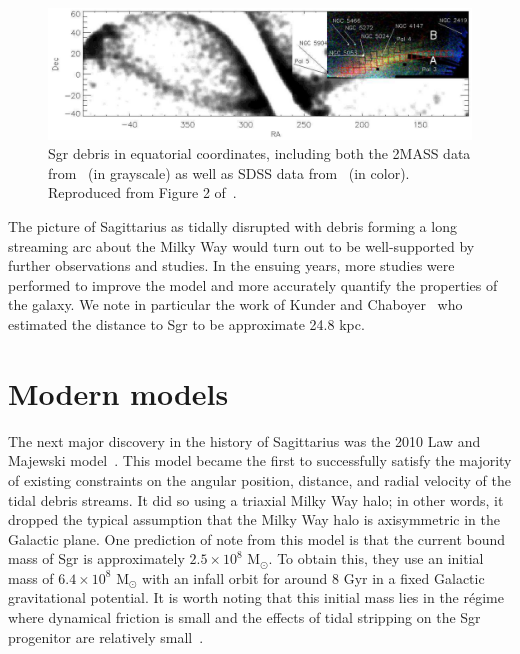 \begin{figure}
    \centering 
    \includegraphics[width=0.95\linewidth]{figs/belokurov2006-2.png}
    \caption{%
        Sgr debris in equatorial coordinates, including both the 2MASS data
        from~\cite{majewski_two_2003} (in grayscale) as well as SDSS data
        from~\cite{belokurov_field_2006} (in color). Reproduced from Figure 2
        of~\cite{belokurov_field_2006}.
    }
    \label{fig:belokurov2006}
\end{figure}

The picture of Sagittarius as tidally disrupted with debris forming a long
streaming arc about the Milky Way would turn out to be well-supported by
further observations and studies. In the ensuing years, more studies were
performed to improve the model and more accurately quantify the properties of
the galaxy. We note in particular the work of Kunder and
Chaboyer~\cite{kunder_distance_2009} who estimated the distance to Sgr to be
approximate 24.8 kpc.


\hypertarget{modern-models}{%
\section{Modern models}\label{modern-models}}

The next major discovery in the history of Sagittarius was the 2010 Law and
Majewski model~\cite{law_sagittarius_2010}. This model became the first to
successfully satisfy the majority of existing constraints on the angular
position, distance, and radial velocity of the tidal debris streams. It did so
using a triaxial Milky Way halo; in other words, it dropped the typical
assumption that the Milky Way halo is axisymmetric in the Galactic plane. One
prediction of note from this model is that the current bound mass of Sgr is
approximately \(2.5 \times 10^8\) M\(_\odot\). To obtain this, they use an
initial mass of \(6.4 \times 10^8\) M\(_\odot\) with an infall orbit for
around 8 Gyr in a fixed Galactic gravitational potential. It is worth noting
that this initial mass lies in the régime where dynamical friction is small
and the effects of tidal stripping on the Sgr progenitor are relatively
small~\cite{dierickx_predicted_2017}.

